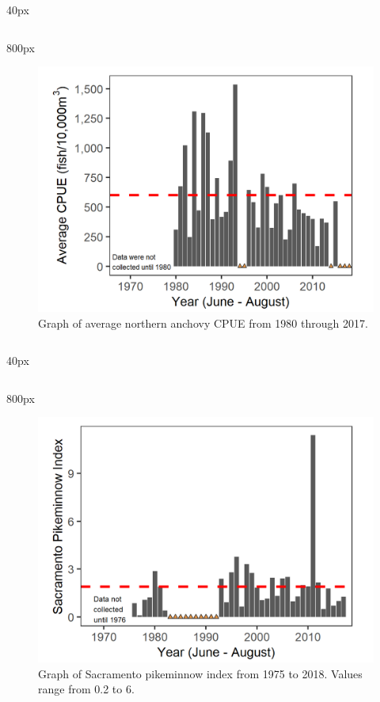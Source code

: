 \documentclass[
]{book}
\begin{document}
\begin{column}{40px\textwidth}
~
\end{column}

\begin{column}{800px\textwidth}
\begin{figure}
\includegraphics[width=15.25in]{figures/noranc_all_years} \caption{Graph of average northern anchovy CPUE from 1980 through 2017.}\label{fig:unnamed-chunk-80}
\end{figure}
\end{column}

\begin{column}{40px\textwidth}
~
\end{column}

\begin{column}{800px\textwidth}
\begin{figure}
\includegraphics[width=15.25in]{figures/DJFMP_sacpikeminnow_summer} \caption{Graph of Sacramento pikeminnow index from 1975 to 2018. Values range from 0.2 to 6.}\label{fig:unnamed-chunk-81}
\end{figure}
\end{column}
\end{document}
